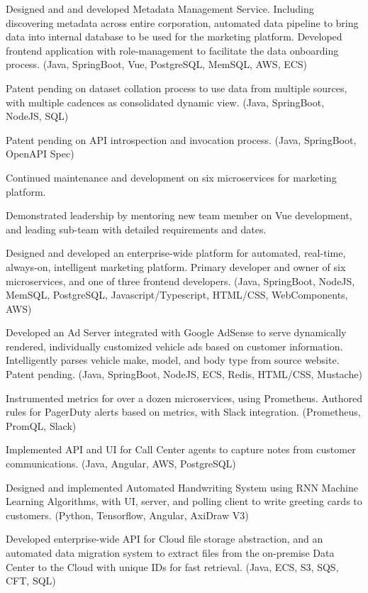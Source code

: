 \documentclass[letterpaper]{deedy-resume-openfont} %
\begin{document}
\begin{tightemize}
\item Designed and and developed Metadata Management Service. Including discovering metadata across entire corporation, automated data pipeline to bring data into internal database to be used for the marketing platform. Developed frontend application with role-management to facilitate the data onboarding process. (Java, SpringBoot, Vue, PostgreSQL, MemSQL, AWS, ECS)
\item Patent pending on dataset collation process to use data from multiple sources, with multiple cadences as consolidated dynamic view. (Java, SpringBoot, NodeJS, SQL)
\item Patent pending on API introspection and invocation process. (Java, SpringBoot, OpenAPI Spec)
\item Continued maintenance and development on six microservices for marketing platform.
\item Demonstrated leadership by mentoring new team member on Vue development, and leading sub-team with detailed requirements and dates.
\end{tightemize}

\sectionsep %


\begin{tightemize}
\item Designed and developed an enterprise-wide platform for automated, real-time, always-on, intelligent marketing platform. Primary developer and owner of six microservices, and one of three frontend developers. (Java, SpringBoot, NodeJS, MemSQL, PostgreSQL, Javascript/Typescript, HTML/CSS, WebComponents, AWS)
\item Developed an Ad Server integrated with Google AdSense to serve dynamically rendered, individually customized vehicle ads based on customer information. Intelligently parses vehicle make, model, and body type from source website. Patent pending. (Java, SpringBoot, NodeJS, ECS, Redis, HTML/CSS, Mustache)
\item Instrumented metrics for over a dozen microservices, using Prometheus. Authored rules for PagerDuty alerts based on metrics, with Slack integration. (Prometheus, PromQL, Slack) 
\item Implemented API and UI for Call Center agents to capture notes from customer communications. (Java, Angular, AWS, PostgreSQL)
\item Designed and implemented Automated Handwriting System using RNN Machine Learning Algorithms, with UI, server, and polling client to write greeting cards to customers. (Python, Tensorflow, Angular, AxiDraw V3)
\item Developed enterprise-wide API for Cloud file storage abstraction, and an automated data migration system to extract files from the on-premise Data Center to the Cloud with unique IDs for fast retrieval. (Java, ECS, S3, SQS, CFT, SQL)
\end{tightemize}
\end{document}
